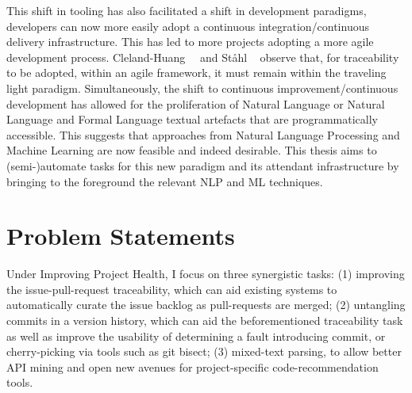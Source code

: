 This shift in tooling has also facilitated a shift in development paradigms,
developers can now more easily adopt a continuous integration/continuous
delivery infrastructure. This has led to more projects adopting a more agile
development process. Cleland-Huang~\etal~\cite{Cleland-Huang2014} and St{\aa}hl
\etal~\cite{Stahl2017} observe that, for traceability to be adopted, within an
agile framework, it must remain within the traveling light paradigm.
Simultaneously, the shift to continuous improvement/continuous development has
allowed for the proliferation of Natural Language or Natural Language and Formal
Language textual artefacts that are programmatically accessible. This suggests
that approaches from Natural Language Processing and Machine Learning are now
feasible and indeed desirable. This thesis aims to (semi-)automate tasks for
this new paradigm and its attendant infrastructure by bringing to the foreground
the relevant NLP and ML techniques.

\section{Problem Statements}
\label{chapter:introduction:sec:problem_statement}

Under Improving Project Health, I focus on three synergistic tasks: (1)
improving the issue-pull-request traceability, which can aid existing systems to
automatically curate the issue backlog as pull-requests are merged; (2)
untangling commits in a version history, which can aid the beforementioned
traceability task as well as improve the usability of determining a fault
introducing commit, or cherry-picking via tools such as git bisect; (3)
mixed-text parsing, to allow better API mining and open new avenues for
project-specific code-recommendation tools. 


